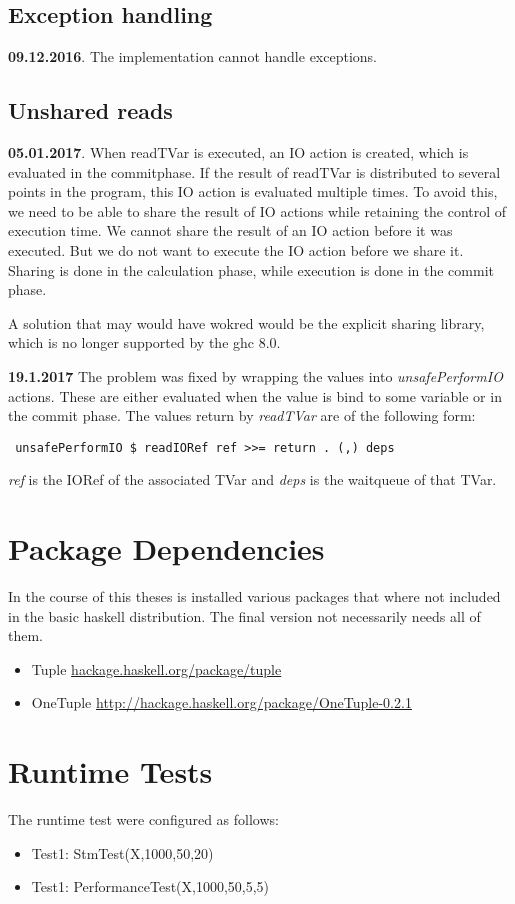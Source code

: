 \documentclass[a4paper,10pt]{article}
\begin{document}
\subsection{Exception handling}
\textbf{09.12.2016}. The implementation cannot handle exceptions.


\subsection{Unshared reads}
\textbf{05.01.2017}. When readTVar is executed, an IO action is created, which is evaluated in the commitphase. If the result of 
readTVar is distributed to several points in the program, this IO action is evaluated multiple times. To avoid this, we need to be
able to share the result of IO actions while retaining the control of execution time. We cannot share the result of an IO action
before it was executed. But we do not want to execute the IO action before we share it. Sharing is done in the calculation phase,
while execution is done in the commit phase.

A solution that may would have wokred would be the explicit sharing library, which is no longer supported by the ghc 8.0.

\textbf{19.1.2017}
The problem was fixed by wrapping the values into \textit{unsafePerformIO} actions. These are either evaluated when the 
value is bind to some variable or in the commit phase. The values return by \textit{readTVar} are of the following form:
\begin{lstlisting}
 unsafePerformIO $ readIORef ref >>= return . (,) deps
\end{lstlisting}
\textit{ref} is the IORef of the associated TVar and \textit{deps} is the waitqueue of that TVar.

\section{Package Dependencies}
In the course of this theses is installed various packages that where not included in the basic haskell distribution.
The final version not necessarily needs all of them.
\begin{itemize}
 \item Tuple \url{hackage.haskell.org/package/tuple}
 \item OneTuple \url{http://hackage.haskell.org/package/OneTuple-0.2.1}
\end{itemize}

\section{Runtime Tests}
The runtime test were configured as follows:
\begin{itemize}
 \item Test1: StmTest(X,1000,50,20)
 \item Test1: PerformanceTest(X,1000,50,5,5)
\end{itemize}





\end{document}
